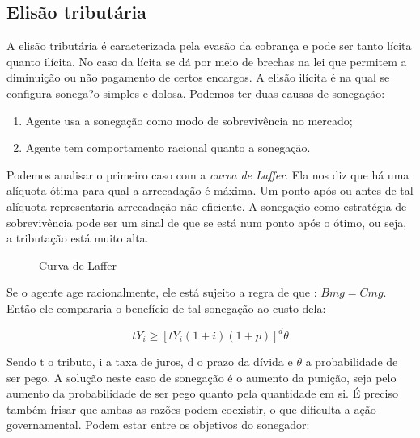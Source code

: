 \documentclass[12pt,a4paper,oneside,brazil]{abntex2}
\begin{document}
\subsection{Elisão tributária}
A elisão tributária é caracterizada pela evasão da cobrança e pode ser tanto lícita quanto ilícita. No caso da lícita se dá por meio de brechas na lei que permitem a diminuição ou não pagamento de certos encargos. A elisão ilícita é na qual se configura sonega?o simples e dolosa. Podemos ter duas causas de sonegação:
\begin{enumerate}
	\item Agente usa a sonegação como modo de sobrevivência no mercado;
	\item Agente tem comportamento racional quanto a sonegação.
\end{enumerate}

Podemos analisar o primeiro caso com a \emph{curva de Laffer}. Ela nos diz que há uma alíquota ótima para qual a arrecadação é máxima. Um ponto após ou antes de tal alíquota representaria arrecadação não eficiente. A sonegação como estratégia de sobrevivência pode ser um sinal de que se está num ponto após o ótimo, ou seja, a tributação está muito alta. 

\begin{figure}
\centering
{}
\caption{Curva de Laffer}
\end{figure}

Se o agente age racionalmente, ele está sujeito a regra de que : $Bmg = Cmg$. Então ele compararia o benefício de tal sonegação ao custo dela:

\begin{equation} \label{sonegar}
 t Y_i \geq [t Y_i (1 + i) (1 + p) ]^d \theta
\end{equation}

Sendo t o tributo, i a taxa de juros, d o prazo da dívida e $\theta$ a probabilidade de ser pego. A solução neste caso de sonegação é o aumento da punição, seja pelo aumento da probabilidade de ser pego quanto pela quantidade em si. É preciso também frisar que ambas as razões podem coexistir, o que dificulta a ação governamental. Podem estar entre os objetivos do sonegador:
\end{document}
